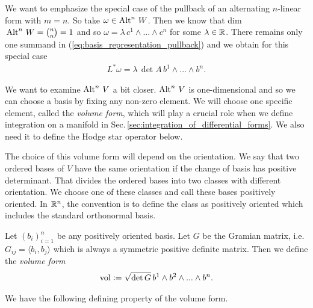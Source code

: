 \documentclass[../master_thesis.tex]{subfiles}
\begin{document}
We want to emphasize the special case of the pullback of an alternating $n$-linear form 
with $m = n$. So take $\omega \in {\operatorname{Alt}^{n}\,W}$. Then we know that 
dim$\,{\operatorname{Alt}^{n}\,W} = {n\choose n} = 1$ and so
$\omega = \lambda\, c^1 \wedge ... \wedge c^n$ for some $\lambda \in \mathbb{R}$. 
There remains only one summand in (\ref{eq:basis_representation_pullback}) 
and we obtain for this special case
\begin{align}
    L^* \omega = \lambda \, \det A \, b^1 \wedge ... \wedge b^n.
    \label{eq:pullback_alternating_nlinear_map}
\end{align}

We want to examine ${\operatorname{Alt}^{n}\,V}$ a bit closer. 
${\operatorname{Alt}^{n}\,V}$ is one-dimensional and so we can choose a basis by fixing 
any non-zero element. We will choose one specific element, 
called the \textit{volume form}, which will play a crucial role 
when we define integration on a manifold in Sec.\,\ref{sec:integration_of_differential_forms}. 
We also need it to 
define the Hodge star operator below.

The choice of this volume form will depend on the orientation. 
We say that two ordered bases of $V$ 
have the same orientation if the change of basis has positive determinant. 
That divides the ordered bases into two classes with different orientation.
We choose one of these classes and call these bases positively
oriented. In $\mathbb{R}^n$, the convention is to define the class as 
positively oriented which includes the standard orthonormal basis.

\begin{definition}
    Let $(b_i )_{i=1}^n$ be any positively oriented
    basis. Let $G$ be the Gramian matrix, i.e. $G_{ij} = \langle b_i, b_j \rangle$ 
    which is always a symmetric positive definite matrix.
    Then we define the \textit{volume form}
    \begin{align*}
        \operatorname{vol} \vcentcolon= \sqrt{\det G} \, b^1 \wedge b^2 \wedge ... \wedge b^n.
    \end{align*}
\end{definition}

We have the following defining property of the volume form.
\end{document}

